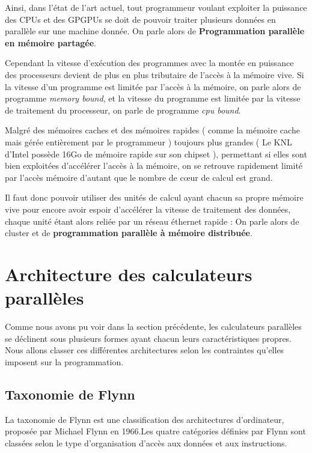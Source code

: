 \documentclass[fleqn,11pt]{article}
\begin{document}
Ainsi, dans l'état de l'art actuel, tout programmeur voulant exploiter la puissance des CPUs et des GPGPUs se doit de pouvoir traiter plusieurs données en parallèle sur une machine donnée. On parle alors de \textbf{Programmation parallèle en mémoire partagée}.

Cependant la vitesse d'exécution des programmes avec la montée en puissance des processeurs devient de plus en plus tributaire de l'accès à la mémoire vive. Si la vitesse d'un programme est limitée par l'accès à la mémoire,  on parle alors de programme \textsl{memory bound}, et la vitesse du programme est limitée par la vitesse de traitement du processeur, on parle de programme \textsl{cpu bound}.

Malgré des mémoires caches et des mémoires rapides ( comme la mémoire cache mais gérée entièrement par le programmeur )  toujours plus grandes ( Le KNL d'Intel possède 16Go de mémoire rapide sur son chipset ), permettant si elles sont bien exploitées d'accélérer l'accès à la mémoire, on se retrouve rapidement limité par l'accès mémoire d'autant que le nombre de cœur de calcul est grand.

Il faut donc pouvoir utiliser des unités de calcul ayant chacun sa propre mémoire vive pour encore avoir espoir d'accélérer la vitesse de traitement des données, chaque unité étant alors reliée par un réseau éthernet rapide : On parle alors de cluster et de \textbf{programmation parallèle à mémoire distribuée}.

\section{Architecture des calculateurs parallèles}

Comme nous avons pu voir dans la section précédente, les calculateurs parallèles se déclinent sous plusieurs formes ayant chacun leurs caractéristiques propres. Nous allons classer ces différentes architectures selon les contraintes qu'elles imposent sur la programmation. 

\subsection{Taxonomie de Flynn}

La taxonomie de Flynn est une classification des architectures d'ordinateur, proposée par Michael Flynn en 1966.Les quatre catégories définies par Flynn sont classées selon le type d'organisation d'accès aux données et aux instructions.
\end{document}
